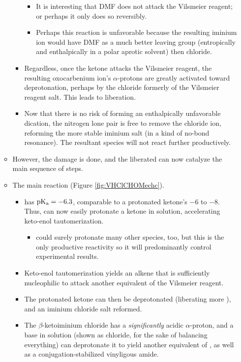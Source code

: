 \documentclass[../notes.tex]{subfiles}
\begin{document}
\begin{itemize}
\begin{itemize}
\begin{itemize}
            \begin{itemize}
                \item It is interesting that DMF does not attack the Vilsmeier reagent; or perhaps it only does so reversibly.
                \item Perhaps this reaction is unfavorable because the resulting iminium ion would have DMF as a much better leaving group (entropically and enthalpically in a polar aprotic solvent) then chloride.
            \end{itemize}
            \item Regardless, once the ketone attacks the Vilsmeier reagent, the resulting oxocarbenium ion's $\alpha$-protons are greatly activated toward deprotonation, perhaps by the chloride formerly of the Vilsmeier reagent salt. This leads to  liberation.
            \item Now that there is no risk of forming an enthalpically unfavorable dication, the nitrogen lone pair is free to remove the chloride ion, reforming the more stable iminium salt (in a kind of no-bond resonance). The resultant species will not react further productively.
        \end{itemize}
        \item However, the damage is done, and the liberated  can now catalyze the main sequence of steps.
        \item The main reaction (Figure \ref{fig:VHClCHOMechc}).
        \begin{itemize}
            \item {} has $\operatorname{\text{p}K_\text{a}}=-6.3$, comparable to a protonated ketone's $-6$ to $-8$. Thus,  can now easily protonate a ketone in solution, accelerating keto-enol tautomerization.
            \begin{itemize}
                \item {} could surely protonate many other species, too, but this is the only productive reactivity so it will predominantly control experimental results.
            \end{itemize}
            \item Keto-enol tautomerization yields an alkene that is sufficiently nucleophilic to attack another equivalent of the Vilsmeier reagent.
            \item The protonated ketone can then be deprotonated (liberating more ), and an iminium chloride salt reformed.
            \item The $\beta$-ketoiminium chloride has a \emph{significantly} acidic $\alpha$-proton, and a base in solution (shown as chloride, for the sake of balancing everything) can deprotonate it to yield another equivalent of , as well as a conjugation-stabilized vinyligous amide.

\end{itemize}
\end{itemize}
\end{itemize}
\end{document}
